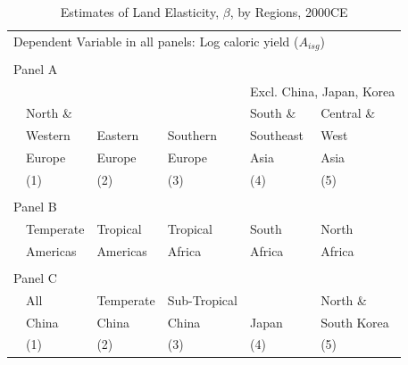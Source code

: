\documentclass[11pt]{article}
\begin{document}
\clearpage
\begin{table}[!htb]
\begin{center}
\caption{Estimates of Land Elasticity, $\beta$, by Regions, 2000CE}
\label{TAB_beta_subregion}
{\footnotesize
\begin{tabularx}{\textwidth}{lXXXXX}
\midrule
\multicolumn{6}{l}{Dependent Variable in all panels: Log caloric yield ($A_{isg}$)} \\ \\
\multicolumn{6}{l}{Panel A} \\
 &          &         &             &  \multicolumn{2}{c}{Excl. China, Japan, Korea} \\ \cmidrule(lr){5-6}
 & North \& &         &              & South \&  & Central \&             \\
 & Western  & Eastern & Southern     & Southeast & West        \\
 & Europe   & Europe  & Europe       & Asia      & Asia      \\
 & (1) & (2) & (3) & (4) & (5) \\
\midrule

\midrule
\\
\multicolumn{6}{l}{Panel B} \\
 & Temperate & Tropical  & Tropical & South    & North    \\
 & Americas  & Americas  & Africa   & Africa   & Africa     \\
\midrule

\midrule
\\
\multicolumn{6}{l}{Panel C} \\
 & All& Temperate & Sub-Tropical & & North \& \\
 & China & China  & China & Japan & South Korea  \\
 & (1) & (2) & (3) & (4) & (5) \\
\midrule

\midrule

\end{tabularx}
}
\end{center}
\vspace{-.5cm}
\end{table}
\end{document}
